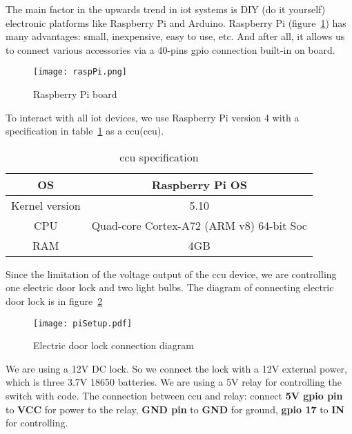 The main factor in the upwards trend in \acrshort{iot} systems is DIY (do it yourself) electronic platforms like Raspberry Pi and Arduino. Raspberry Pi (figure~\ref{fig:raspi}) has many advantages: small, inexpensive, easy to use, etc. And after all, it allows us to connect various accessories via a 40-pins \acrshort{gpio} connection built-in on board.

\begin{figure}[H]
    \centering
    \texttt{[image: raspPi.png]}
    \caption{Raspberry Pi board}
    \label{fig:raspi}
\end{figure}

To interact with all \acrshort{iot} devices, we use Raspberry Pi version 4 with a specification in table~\ref{tab:raspiSpecs} as a \acrshort{ccu}(\acrlong{ccu}).  

\begin{table}[H]
    \centering
    \caption{\acrlong{ccu} specification}
    \begin{tabular}{|c|c|}
        \hline
        OS & Raspberry Pi OS \\
        \hline
        Kernel version & 5.10\\
        \hline
        CPU & Quad-core Cortex-A72 (ARM v8) 64-bit Soc \\
        \hline
        RAM & 4GB\\
        \hline
    \end{tabular}
    \label{tab:raspiSpecs}
\end{table}

Since the limitation of the voltage output of the \acrshort{ccu} device, we are controlling one electric door lock and two light bulbs. The diagram of connecting electric door lock is in figure~\ref{fig:doorLockDiag}

\begin{figure}[H]
    \centering
    \texttt{[image: piSetup.pdf]}
    \caption{Electric door lock connection diagram}
    \label{fig:doorLockDiag}
\end{figure}

We are using a 12V DC lock. So we connect the lock with a 12V external power, which is three 3.7V 18650 batteries. We are using a 5V relay for controlling the switch with code. The connection between \acrshort{ccu} and relay: connect \textbf{5V \acrshort{gpio} pin} to \textbf{VCC} for power to the relay, \textbf{GND pin} to \textbf{GND} for ground, \textbf{\acrshort{gpio} 17} to \textbf{IN} for controlling.

